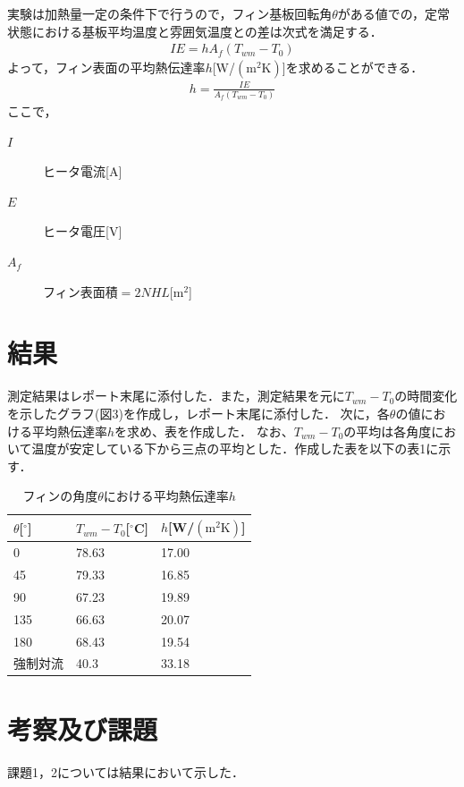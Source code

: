 \documentclass[a4paper,11pt,uplatex]{jsarticle}
\begin{document}
\par
実験は加熱量一定の条件下で行うので，フィン基板回転角$\theta$がある値での，定常状態における基板平均温度と雰囲気温度との差は次式を満足する．
\begin{align}
  IE = hA_f (T_{wm}- T_0)
\end{align}
よって，フィン表面の平均熱伝達率$h$[W/$(\mathrm{m}^2 \mathrm{K})$]を求めることができる．
\begin{align}
  h=\frac{IE}{A_f(T_{wm}-T_0)}
\end{align}
ここで，
\begin{description}
  \item[$I$] ヒータ電流[A]
  \item[$E$] ヒータ電圧[V]
  \item[$A_f$] フィン表面積$=2NHL$[m$^2$]
\end{description}
\section{結果}
測定結果はレポート末尾に添付した．また，測定結果を元に$T_{wm}−T_0$の時間変化を示したグラフ(図3)を作成し，レポート末尾に添付した．
次に，各$\theta$の値における平均熱伝達率$h$を求め、表を作成した．
なお、$T_{wm}−T_0$の平均は各角度において温度が安定している下から三点の平均とした．作成した表を以下の表1に示す．
\begin{table}[H]
\begin{center}
\caption{フィンの角度$\theta$における平均熱伝達率$h$}
\begin{tabular}{lll}
$\theta$[$^\circ$]& $T_{wm}-T_0$[$^\circ$C] & $h$[W/$(\mathrm{m}^2 \mathrm{K})$] \\ \hline
0 & 78.63 &  17.00 \\ \hline
45 & 79.33 & 16.85\\ \hline
90 & 67.23 & 19.89 \\ \hline
135 & 66.63 & 20.07 \\ \hline
180 & 68.43 & 19.54 \\ \hline
強制対流 & 40.3 & 33.18 \\ \hline
\end{tabular}
\end{center}
\end{table}
\section{考察及び課題}
課題1，2については結果において示した．
\end{document}
